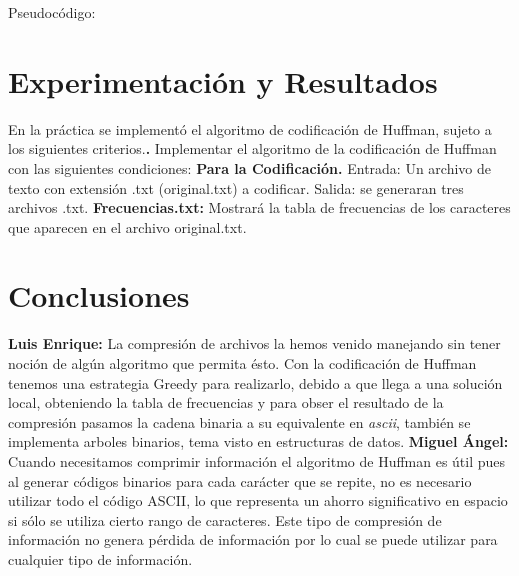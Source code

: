 \documentclass[12pt,twoside]{article}
\begin{document}
Pseudoc\'odigo:

\newpage
\section{Experimentaci\'on y Resultados}

En la pr\'actica se implement\'o el algoritmo de codificaci\'on de Huffman, sujeto a los siguientes criterios.\newline \textbf{.} Implementar el algoritmo de la codificaci\'on de Huffman con las siguientes condiciones:\newline \newline
\textbf{Para la Codificaci\'on.}\newline
Entrada: Un archivo de texto con extensi\'on .txt (original.txt) a codificar.\newline
Salida: se generaran tres archivos .txt.\newline
\textbf{Frecuencias.txt: }Mostrar\'a la tabla de frecuencias de los caracteres que
aparecen en el archivo original.txt. \newline


		
\section{Conclusiones}

\textbf{\newline Luis Enrique:}
La compresi\'on de archivos la hemos venido manejando sin tener noci\'on de alg\'un algoritmo que permita \'esto. Con la codificaci\'on de Huffman tenemos una estrategia Greedy para realizarlo, debido a que llega a una soluci\'on local, obteniendo la tabla de frecuencias y para obser el resultado de la compresi\'on pasamos la cadena binaria a su equivalente en \textit{ascii}, tambi\'en se implementa arboles binarios, tema visto en estructuras de datos.\newline \newline
\textbf{\newline Miguel \'Angel:}
Cuando necesitamos comprimir informaci\'on el algoritmo de Huffman es \'util pues al generar c\'odigos binarios para cada car\'acter que se repite, no es necesario utilizar todo el c\'odigo ASCII, lo que representa un ahorro significativo en espacio si sólo se utiliza cierto rango de caracteres. Este tipo de compresi\'on de informaci\'on no genera p\'erdida de informaci\'on por lo cual se puede utilizar para cualquier tipo de informaci\'on. 
\end{document}
